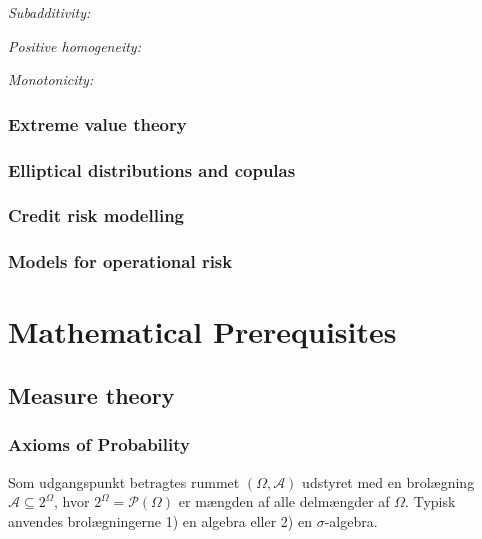 \documentclass[a4paper,12pt,openany]{book}
\begin{document}
\emph{Subadditivity:}

\emph{Positive homogeneity:}

\emph{Monotonicity:}

\hypertarget{extreme-value-theory}{%
\section{Extreme value theory}\label{extreme-value-theory}}

\hypertarget{elliptical-distributions-and-copulas}{%
\section{Elliptical distributions and copulas}\label{elliptical-distributions-and-copulas}}

\hypertarget{credit-risk-modelling}{%
\section{Credit risk modelling}\label{credit-risk-modelling}}

\hypertarget{models-for-operational-risk}{%
\section{Models for operational risk}\label{models-for-operational-risk}}

\hypertarget{part-mathematical-prerequisites}{%
\part{Mathematical Prerequisites}\label{part-mathematical-prerequisites}}

\hypertarget{appendix-appendix}{%
\appendix}


\hypertarget{measure-theory}{%
\chapter{Measure theory}\label{measure-theory}}

\hypertarget{axioms-of-probability}{%
\section{Axioms of Probability}\label{axioms-of-probability}}

Som udgangspunkt betragtes rummet \((\Omega,\mathcal{A})\) udstyret med en brolægning \(\mathcal{A}\subseteq 2^\Omega\), hvor \(2^\Omega=\mathcal{P}(\Omega)\) er mængden af alle delmængder af \(\Omega\). Typisk anvendes brolægningerne 1) en algebra eller 2) en \(\sigma\)-algebra.
\end{document}
